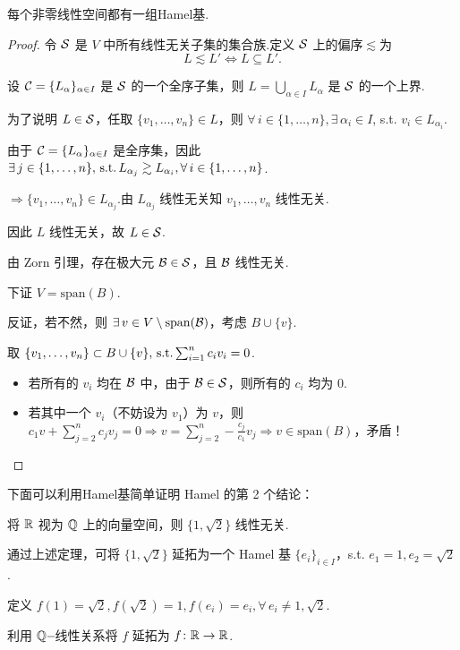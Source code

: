\begin{theorem}[Hausdorff, 1932]
    每个非零线性空间都有一组Hamel基.
\end{theorem}

\begin{proof}
    令 $\mathcal{S}$ 是 $V$ 中所有线性无关子集的集合族.定义 $\mathcal{S}$ 上的偏序$\lesssim$为
    \begin{equation*}
        L \lesssim L' \iff L \subseteq L'.
    \end{equation*}\par
    设 $\mathcal{C}=\{L_\alpha\}_{\alpha \in I}$ 是 $\mathcal{S}$ 的一个全序子集，则 $L = \bigcup_{\alpha\in I} L_\alpha$ 是 $\mathcal{S}$ 的一个上界.\par
    为了说明 $L \in \mathcal{S}$，任取 $\{v_1, \dots, v_n\} \in L$，则 $\forall\, i \in \{1, \dots, n\}, \exists\, \alpha_i \in I$, s.t. $v_i \in L_{\alpha_i}$.\par
    由于 $\mathcal{C}=\{L_\alpha\}_{\alpha \in I}$ 是全序集，因此 $\exists\, j \in \{1, \dots, n\},\operatorname{\,\text{s.t.}} L_{\alpha_j}\gtrsim L_{\alpha_i}, \forall\, i \in \{1, \dots, n\}$.\par
    $\Rightarrow \{v_1, \dots, v_n\} \in L_{\alpha_j}$.由 $L_{\alpha_j}$ 线性无关知 $v_1, \dots, v_n$ 线性无关.\par
    因此 $L$ 线性无关，故 $L \in \mathcal{S}$.\par
    由 Zorn 引理，存在极大元 $\mathcal{B} \in \mathcal{S}$，且 $\mathcal{B}$ 线性无关.\par
    下证 $V = \mathrm{span}(B)$.\par
    反证，若不然，则 $\exists\, v \in V \setminus \operatorname{span}(\mathcal{B})$，考虑 $B \cup \{v\}$.\par
    取 $\{v_1, \dots, v_n\} \subset B \cup \{v\},\operatorname{\,\text{s.t.}} \sum_{i=1}^n c_i v_i = 0$.\par
    \begin{itemize}
        \item 若所有的 $v_i$ 均在 $\mathcal{B}$ 中，由于 $\mathcal{B} \in \mathcal{S}$，则所有的 $c_i$ 均为 $0$.
        \item 若其中一个 $v_i$（不妨设为 $v_1$）为 $v$，则 $c_1 v + \sum_{j=2}^n c_j v_j = 0 \Rightarrow v = \sum_{j=2}^n -\frac{c_j}{c_1} v_j \Rightarrow v \in \mathrm{span}(B)$，矛盾！ \qedhere
    \end{itemize}
\end{proof}

下面可以利用Hamel基简单证明 Hamel 的第 2 个结论：\par
将 $\mathbb{R}$ 视为 $\mathbb{Q}$ 上的向量空间，则 $\{1, \sqrt{2}\}$ 线性无关.\par
通过上述定理，可将 $\{1, \sqrt{2}\}$ 延拓为一个 Hamel 基 $\{e_i\}_{i \in I}$，s.t. $e_1 = 1, e_2 = \sqrt{2}$.\par
定义 $f(1) = \sqrt{2}, f(\sqrt{2}) = 1, f(e_i) = e_i, \forall\, e_i \neq 1, \sqrt{2}$.\par
利用 $\mathbb{Q}-\!$线性关系将 $f$ 延拓为 $f \colon \mathbb{R} \to \mathbb{R}$.\par

